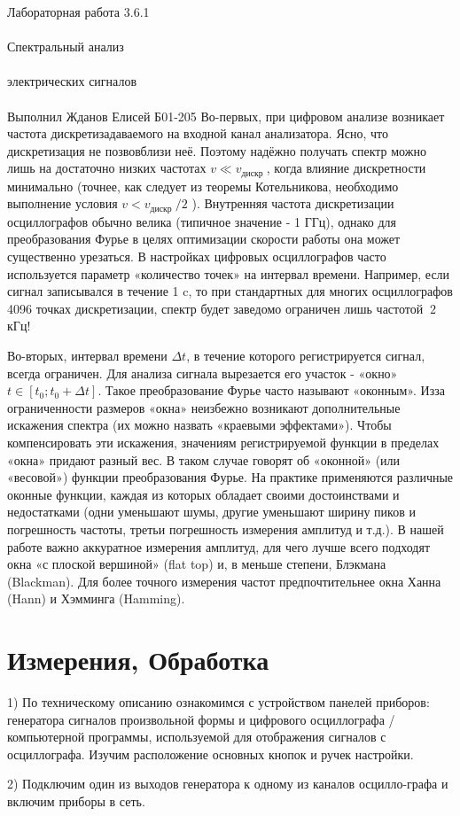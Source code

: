 \documentclass{astroedu-lab}
\begin{document}
\begin{problem}{\huge Лабораторная работа 3.6.1\\\\Спектральный анализ\\\\электрических сигналов\\\\Выполнил Жданов Елисей Б01-205}
Во-первых, при цифровом анализе возникает частота дискретизадаваемого на входной канал анализатора. Ясно, что дискретизация не позвовблизи неё. Поэтому надёжно получать спектр можно лишь на достаточно низких частотах $v \ll v_{\text {дискр }}$, когда влияние дискретности минимально (точнее, как следует из теоремы Котельникова, необходимо выполнение условия $v<v_{\text {дискр }} / 2$ ). Внутренняя частота дискретизации осциллографов обычно велика (типичное значение - 1 ГГц), однако для преобразования Фурье в целях оптимизации скорости работы она может существенно урезаться. В настройках цифровых осциллографов часто используется параметр «количество точек» на интервал времени. Например, если сигнал записывался в течение 1 c, то при стандартных для многих осциллографов 4096 точках дискретизации, спектр будет заведомо ограничен лишь частотой $~ 2$ кГц!

Во-вторых, интервал времени $\Delta t$, в течение которого регистрируется сигнал, всегда ограничен. Для анализа сигнала вырезается его участок - «окно» $t \in\left[t_0 ; t_0+\Delta t\right]$. Такое преобразование Фурье часто называют «оконным». Изза ограниченности размеров «окна» неизбежно возникают дополнительные искажения спектра (их можно назвать «краевыми эффектами»). Чтобы компенсировать эти искажения, значениям регистрируемой функции в пределах «окна» придают разный вес. В таком случае говорят об «оконной» (или «весовой») функции преобразования Фурье. На практике применяются различные оконные функции, каждая из которых обладает своими достоинствами и недостатками (одни уменьшают шумы, другие уменьшают ширину пиков и погрешность частоты, третьи погрешность измерения амплитуд и т.д.). В нашей работе важно аккуратное измерения амплитуд, для чего лучше всего подходят окна «с плоской вершиной» (flat top) и, в меньше степени, Блэкмана (Blackman). Для более точного измерения частот предпочтительнее окна Ханна (Hann) и Хэмминга (Hamming).

\section{Измерения, Обработка}

1) По техническому описанию ознакомимся с устройством панелей приборов: генератора сигналов произвольной формы и цифрового осциллографа / компьютерной программы, используемой для отображения сигналов с осциллографа. Изучим расположение основных кнопок и ручек настройки.

2) Подключим один из выходов генератора к одному из каналов осцилло-графа и включим приборы в сеть.


\end{problem}
\end{document}
